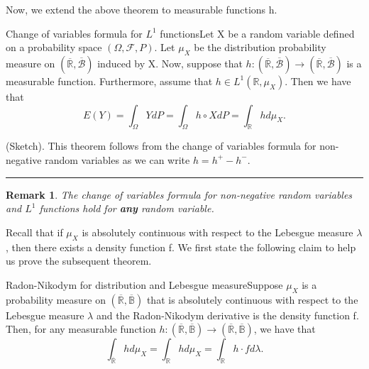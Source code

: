 \documentclass[twoside]{article}
\newtheorem{remark}[theorem]{Remark}
\newenvironment{proof}{{\bf Proof:}}{\hfill\rule{2mm}{2mm}}
\newcommand{\borelsigmaalgebra}{\mathcal{B}}
\begin{document}
Now, we extend the above theorem to measurable functions h.

\begin{theorem_exam}{Change of variables formula for $L^1$ functions}{}Let X be a random variable defined on a probability space $(\Omega, \mathcal{F}, P)$. Let $\mu_X$ be the distribution probability measure on $(\overline{\mathbb{R}}, \overline{\borelsigmaalgebra})$ induced by X. Now, suppose that $h: (\overline{\mathbb{R}}, \overline{\borelsigmaalgebra}) \rightarrow (\overline{\mathbb{R}}, \overline{\borelsigmaalgebra})$ is a measurable function. Furthermore, assume that $h \in L^1(\mathbb{R}, \mu_X).$ Then we have that 
$$
E(Y) = \int_{\Omega} YdP = \int_{\Omega}h \circ XdP = \int_{\mathbb{R}}hd\mu_X .
$$
\end{theorem_exam}

\begin{proof}(Sketch). This theorem follows from the change of variables formula for non-negative random variables as we can write $h = h^+ - h^-.$
\end{proof}

\begin{remark}
The change of variables formula for non-negative random variables and $L^1$ functions hold for \textbf{any} random variable.
\end{remark}


Recall that if $\mu_X$ is absolutely continuous with respect to the Lebesgue measure $\lambda$, then there exists a density function f. We first state the following claim to help us prove the subsequent theorem.

\begin{proposition_exam}{Radon-Nikodym for distribution and Lebesgue measure}{}Suppose $\mu_X$ is a probability measure on $(\overline{\mathbb{R}}, \overline{\mathbb{B}})$ that is absolutely continuous with respect to the Lebesgue measure $\lambda$ and the Radon-Nikodym derivative is the density function f. Then, for any measurable function $h:(\overline{\mathbb{R}}, \overline{\mathbb{B}}) \rightarrow (\overline{\mathbb{R}}, \overline{\mathbb{B}})$, we have that 
$$
\int_{\overline{\mathbb{R}}}hd\mu_X = \int_{\mathbb{R}}hd\mu_X = \int_{\mathbb{R}}h\cdot fd\lambda.
$$
\end{proposition_exam}
\end{document}
